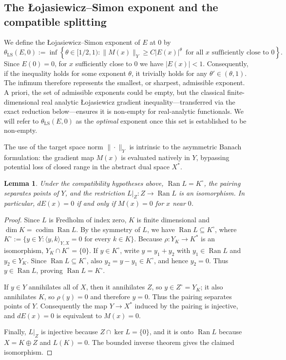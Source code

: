 \documentclass[11pt]{article}
\newtheorem{lemma}[theorem]{Lemma}
\theoremstyle{definition}
\theoremstyle{remark}
\begin{document}
\subsection{The \L{}ojasiewicz--Simon exponent and the compatible splitting}

We define the \L{}ojasiewicz--Simon exponent of $E$ at $0$ by
$$\theta_{\mathrm{LS}}(E,0) := \inf \left\{ \theta \in [1/2,1) : \|M(x)\|_Y \ge C |E(x)|^{\theta} \, \text{ for all } x \text{ sufficiently close to } 0 \right\}.$$
Since $E(0)=0$, for $x$ sufficiently close to $0$ we have $|E(x)| < 1$. Consequently, if the inequality holds for some exponent $\theta$, it trivially holds for any $\theta' \in (\theta, 1)$. The infimum therefore represents the smallest, or sharpest, admissible exponent. A priori, the set of admissible exponents could be empty, but the classical finite-dimensional real analytic \L{}ojasiewicz gradient inequality---transferred via the exact reduction below---ensures it is non-empty for real-analytic functionals. We will refer to $\theta_{\mathrm{LS}}(E,0)$ as the \emph{optimal} exponent once this set is established to be non-empty.

\smallskip
The use of the target space norm $\|\cdot\|_Y$ is intrinsic to the asymmetric Banach formulation: the gradient map $M(x)$ is evaluated natively in $Y$, bypassing potential loss of closed range in the abstract dual space $X^*$.

\begin{lemma}\label{lem:compatibility-consequences}
Under the compatibility hypotheses above, $\operatorname{Ran}L=K^\circ$, the pairing separates points of $Y$, and the restriction $L|_Z:Z\to\operatorname{Ran}L$ is an isomorphism. In particular, $dE(x)=0$ if and only if $M(x)=0$ for $x$ near $0$.
\end{lemma}

\begin{proof}
Since $L$ is Fredholm of index zero, $K$ is finite dimensional and $\dim K=\operatorname{codim}\operatorname{Ran}L$. By the symmetry of $L$, we have $\operatorname{Ran}L\subseteq K^\circ$, where $K^\circ:=\{y\in Y:\langle y,k\rangle_{Y,X}=0\text{ for every }k\in K\}$.
Because $\rho:Y_K\to K^*$ is an isomorphism, $Y_K\cap K^\circ=\{0\}$. If $y\in K^\circ$, write $y=y_1+y_2$ with $y_1\in\operatorname{Ran}L$ and $y_2\in Y_K$. Since $\operatorname{Ran}L\subseteq K^\circ$, also $y_2=y-y_1\in K^\circ$, and hence $y_2=0$. Thus $y\in\operatorname{Ran}L$, proving $\operatorname{Ran}L=K^\circ$.

If $y\in Y$ annihilates all of $X$, then it annihilates $Z$, so $y\in Z^\circ=Y_K$; it also annihilates $K$, so $\rho(y)=0$ and therefore $y=0$. Thus the pairing separates points of $Y$. Consequently the map $Y\to X^*$ induced by the pairing is injective, and $dE(x)=0$ is equivalent to $M(x)=0$.

Finally, $L|_Z$ is injective because $Z\cap\ker L=\{0\}$, and it is onto $\operatorname{Ran}L$ because $X=K\oplus Z$ and $L(K)=0$. The bounded inverse theorem gives the claimed isomorphism.
\end{proof}
\end{document}
